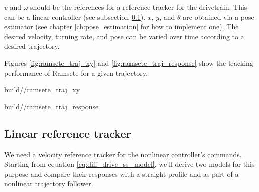 $v$ and $\omega$ should be the \glspl{reference} for a \gls{reference} tracker
for the drivetrain. This can be a linear controller (see subsection
\ref{subsec:linear_reference_tracker}). $x$, $y$, and $\theta$ are obtained via
a \gls{pose} estimator (see chapter \ref{ch:pose_estimation} for how to
implement one). The desired velocity, turning rate, and \gls{pose} can be varied
over time according to a desired trajectory.

Figures \ref{fig:ramsete_traj_xy} and \ref{fig:ramsete_traj_response} show the
tracking performance of Ramsete for a given trajectory.
\begin{bookfigure}
  \begin{minisvg}{2}{build/\chapterpath/ramsete_traj_xy}
    \caption{Ramsete nonlinear controller x-y plot}
    \label{fig:ramsete_traj_xy}
  \end{minisvg}
  \hfill
  \begin{minisvg}{2}{build/\chapterpath/ramsete_traj_response}
    \caption{Ramsete nonlinear controller response}
    \label{fig:ramsete_traj_response}
  \end{minisvg}
\end{bookfigure}

\subsection{Linear reference tracker}
\label{subsec:linear_reference_tracker}

We need a velocity \gls{reference} tracker for the nonlinear \gls{controller}'s
commands. Starting from equation \eqref{eq:diff_drive_ss_model}, we'll derive
two \glspl{model} for this purpose and compare their responses with a straight
profile and as part of a nonlinear trajectory follower.

